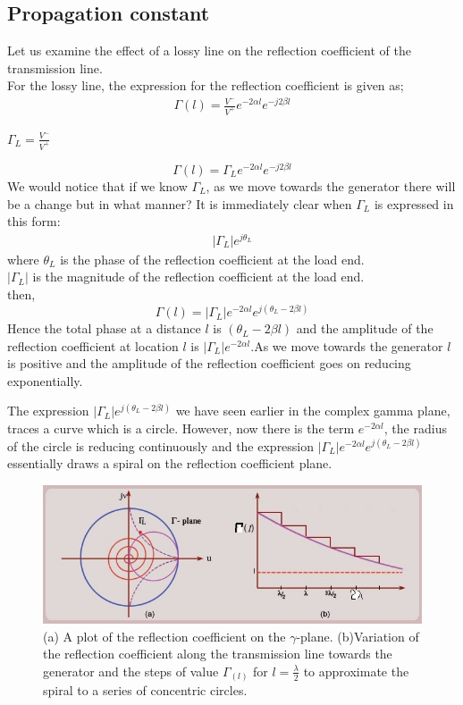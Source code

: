 \subsection{Propagation constant}
Let us examine the effect of a lossy line on the reflection coefficient of the transmission line.
\\For the lossy line, the expression for the reflection coefficient is given as;
\begin{align*}
\Gamma{(l)} = \frac{V^-}{V^+}e^{-2\alpha l}e^{-j2\beta l}
\end{align*}
\begin{center}
$\Gamma_L =\frac{V^-}{V^+}$
\end{center}
\begin{dmath*} 
\Gamma{(l)} = \Gamma_Le^{-2\alpha l}e^{-j2\beta l}
\end{dmath*}
We would notice that if we know $\Gamma_L$, as we move towards the generator there will be a change but in what manner? It is immediately clear when $\Gamma_L$ is expressed in this form:
\begin{align*}
|\Gamma_L |e^{j\theta_L}
\end{align*}
where $\theta_L$ is the phase of the reflection coefficient at the load end.
\\$|\Gamma_L|$ is the magnitude of the reflection coefficient at the load end.\\
then,
\begin{dmath*}
\Gamma{(l)} = |\Gamma_L|e^{-2\alpha l}e^{j(\theta_L-2\beta l)}
\end{dmath*}
Hence the total phase at a distance $l$ is $(\theta_L - 2\beta l)$ and the amplitude of the reflection coefficient at location $l$ is $|\Gamma_L|e^{-2\alpha l}$.As we move towards the generator $l$ is positive and the amplitude of the reflection coefficient goes on reducing exponentially.

The expression $|\Gamma_L|e^{j(\theta_L-2\beta l)}$ we have seen earlier in the complex gamma plane, traces a curve which is a circle. However, now there is the term $e^{-2\alpha l}$, the radius of the circle is reducing continuously and the expression $|\Gamma_L|e^{-2\alpha l}e^{j(\theta_L - 2\beta l)}$ essentially draws a spiral on the reflection coefficient plane.
\begin{figure}[h]
\centering
\includegraphics[width=1\linewidth]{"./graphics/Smith chart lossy line"}
\caption{(a) A plot of the reflection coefficient on the $\gamma$-plane. (b)Variation of the reflection coefficient along the transmission line towards the generator and the steps of value $\Gamma_{(l)}$ for $l = \frac{\lambda}{2}$ to approximate the spiral to a series of concentric circles.}
\end{figure}

